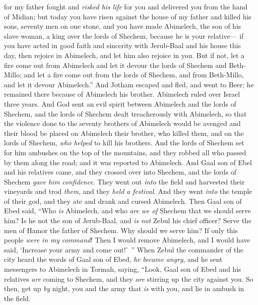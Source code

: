 \begin{biblechapter}
\verse for my father fought and \textit{risked his life} for you and delivered you from the hand of Midian;
\verse but today you have risen against the house of my father and killed his sons, seventy men on one stone, and you have made Abimelech, the son of his slave woman, a king over the lords of Shechem, because he is your relative—
\verse if you have acted in good faith and sincerity with Jerub-Baal and his house this day, then rejoice in Abimelech, and let him also rejoice in you.
\verse But if not, let a fire come out from Abimelech and let it devour the lords of Shechem and Beth-Millo; and let a fire come out from the lords of Shechem, and from Beth-Millo, and let it devour Abimelech.”
\verse And Jotham escaped and fled, and went to Beer; he remained there because of Abimelech his brother.
 Abimelech ruled over Israel three years.
\verse And God sent an evil spirit between Abimelech and the lords of Shechem, and the lords of Shechem dealt treacherously with Abimelech,
\verse so that the violence done to the seventy brothers of Abimelech would be avenged and their blood be placed on Abimelech their brother, who killed them, and on the lords of Shechem, \textit{who helped} to kill his brothers.
\verse And the lords of Shechem set for him ambushes on the top of the mountains, and they robbed all who passed by them along the road; and it was reported to Abimelech.
\verse And Gaal son of Ebel and his relatives came, and they crossed over into Shechem, and the lords of Shechem \textit{gave him confidence}.
\verse They went out \textit{into} the field and harvested their vineyards and trod \textit{them}, and they \textit{held a festival}. And they went \textit{into} the temple of their god, and they ate and drank and cursed Abimelech.
\verse Then Gaal son of Ebed said, “Who \textit{is} Abimelech, and who \textit{are we of} Shechem that we should serve him? Is he not the son of Jerub-Baal, and \textit{is not} Zebul his chief officer? Serve the men of Hamor the father of Shechem. Why should we serve him?
\verse If only this people \textit{were in my command}! Then I would remove Abimelech, and I would have said, ‘Increase your army and come out!’ ”
\verse When Zebul the commander of the city heard the words of Gaal son of Ebed, \textit{he became angry},
\verse and he sent messengers to Abimelech in Tormah, saying, “Look, Gaal son of Ebed and his relatives \textit{are} coming to Shechem, and they \textit{are} stirring up the city against you.
\verse So then, get up \textit{by} night, you and the army that \textit{is} with you, and lie in ambush in the field.

\end{biblechapter}

